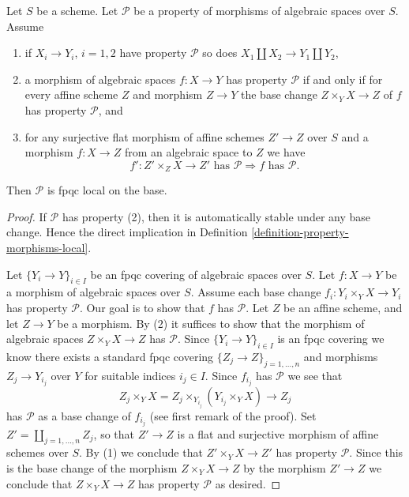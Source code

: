 \begin{lemma}
\label{lemma-descending-properties-morphisms}
Let $S$ be a scheme. Let $\mathcal{P}$ be a property of morphisms of
algebraic spaces over $S$. Assume
\begin{enumerate}
\item if $X_i \to Y_i$, $i = 1, 2$ have property $\mathcal{P}$ so
does $X_1 \amalg X_2 \to Y_1 \amalg Y_2$,
\item a morphism of algebraic spaces $f : X \to Y$ has property
$\mathcal{P}$ if and only if for every affine scheme $Z$ and
morphism $Z \to Y$ the base change $Z \times_Y X \to Z$ of $f$
has property $\mathcal{P}$, and
\item for any surjective flat morphism of affine schemes
$Z' \to Z$ over $S$ and a morphism $f : X \to Z$ from an algebraic space
to $Z$ we have
$$
f' : Z' \times_Z X \to Z'\text{ has }\mathcal{P}
\Rightarrow
f\text{ has }\mathcal{P}.
$$
\end{enumerate}
Then $\mathcal{P}$ is fpqc local on the base.
\end{lemma}

\begin{proof}
If $\mathcal{P}$ has property (2), then it is automatically
stable under any base change. Hence the direct implication in
Definition \ref{definition-property-morphisms-local}.

\medskip\noindent
Let $\{Y_i \to Y\}_{i \in I}$ be an fpqc covering of algebraic spaces over $S$.
Let $f : X \to Y$ be a morphism of algebraic spaces over $S$.
Assume each base change $f_i : Y_i \times_Y X \to Y_i$ has property
$\mathcal{P}$. Our goal is to show that $f$ has $\mathcal{P}$.
Let $Z$ be an affine scheme, and let $Z \to Y$ be a morphism.
By (2) it suffices to show that the morphism of algebraic spaces
$Z \times_Y X \to Z$ has $\mathcal{P}$.
Since $\{Y_i \to Y\}_{i \in I}$ is an fpqc covering we know there
exists a standard fpqc covering $\{Z_j \to Z\}_{j = 1, \ldots , n}$
and morphisms $Z_j \to Y_{i_j}$ over $Y$ for suitable indices $i_j \in I$.
Since $f_{i_j}$ has $\mathcal{P}$ we see that
$$
Z_j \times_Y X
=
Z_j \times_{Y_{i_j}} (Y_{i_j} \times_Y X)
\longrightarrow
Z_j
$$
has $\mathcal{P}$ as a base change of $f_{i_j}$ (see first remark of the
proof). Set $Z' = \coprod_{j = 1, \ldots, n} Z_j$, so that $Z' \to Z$ is
a flat and surjective morphism of affine schemes over $S$. By (1)
we conclude that $Z' \times_Y X \to Z'$ has property $\mathcal{P}$.
Since this is the base change of the morphism $Z \times_Y X \to Z$
by the morphism $Z' \to Z$ we conclude that
$Z \times_Y X \to Z$ has property $\mathcal{P}$ as desired.
\end{proof}


